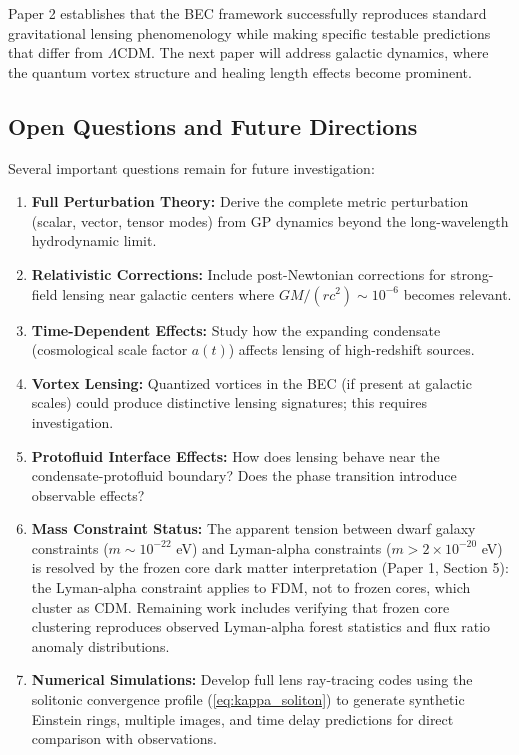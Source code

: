 \documentclass[11pt,a4paper]{article}
\theoremstyle{definition}
\theoremstyle{remark}
\begin{document}
Paper 2 establishes that the BEC framework successfully reproduces standard gravitational lensing phenomenology while making specific testable predictions that differ from $\Lambda$CDM. The next paper will address galactic dynamics, where the quantum vortex structure and healing length effects become prominent.

\subsection{Open Questions and Future Directions}
\label{sec:future_directions}

Several important questions remain for future investigation:

\begin{enumerate}[leftmargin=*, itemsep=0.3em]

\item \textbf{Full Perturbation Theory:} Derive the complete metric perturbation (scalar, vector, tensor modes) from GP dynamics beyond the long-wavelength hydrodynamic limit.

\item \textbf{Relativistic Corrections:} Include post-Newtonian corrections for strong-field lensing near galactic centers where $GM/(rc^2) \sim 10^{-6}$ becomes relevant.

\item \textbf{Time-Dependent Effects:} Study how the expanding condensate (cosmological scale factor $a(t)$) affects lensing of high-redshift sources.

\item \textbf{Vortex Lensing:} Quantized vortices in the BEC (if present at galactic scales) could produce distinctive lensing signatures; this requires investigation.

\item \textbf{Protofluid Interface Effects:} How does lensing behave near the condensate-protofluid boundary? Does the phase transition introduce observable effects?

\item \textbf{Mass Constraint Status:} The apparent tension between dwarf galaxy constraints ($m \sim 10^{-22}$ eV) and Lyman-alpha constraints ($m > 2 \times 10^{-20}$ eV) is resolved by the frozen core dark matter interpretation (Paper 1, Section 5): the Lyman-alpha constraint applies to FDM, not to frozen cores, which cluster as CDM. Remaining work includes verifying that frozen core clustering reproduces observed Lyman-alpha forest statistics and flux ratio anomaly distributions.

\item \textbf{Numerical Simulations:} Develop full lens ray-tracing codes using the solitonic convergence profile (\ref{eq:kappa_soliton}) to generate synthetic Einstein rings, multiple images, and time delay predictions for direct comparison with observations.

\end{enumerate}
\end{document}
